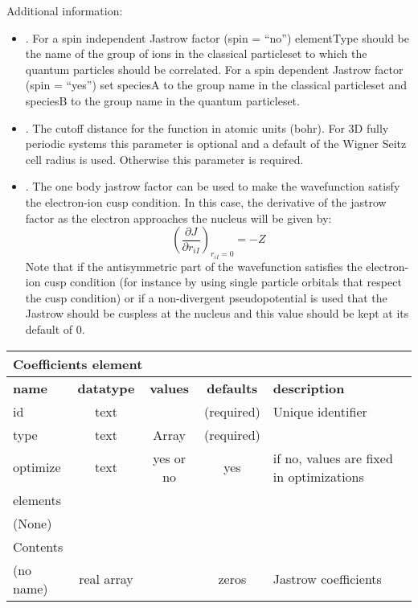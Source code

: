 Additional information:

 \begin{itemize}
 \item {}.  For a spin independent Jastrow factor (spin = ``no'')
elementType should be the name of the group of ions in the classical particleset to which the quantum
particles should be correlated.  For a spin dependent Jastrow factor (spin = ``yes'') set speciesA to the
group name in the classical particleset and speciesB to the group name in the quantum particleset.
 \item {}. The cutoff distance for the function in atomic units (bohr). 
For 3D fully periodic systems this parameter is optional and a default of the Wigner 
Seitz cell radius is used. Otherwise this parameter is required.
 \item {}. The one body jastrow factor can be used to make the wavefunction
satisfy the electron-ion cusp condition\cite{kato}.  In this case, the derivative of the jastrow
factor as the electron approaches the nucleus will be given by:
\begin{equation}
\left(\frac{\partial J}{\partial r_{iI}}\right)_{r_{iI} = 0} = -Z
\end{equation}
Note that if the antisymmetric part of the wavefunction satisfies the electron-ion cusp
condition (for instance by using single particle orbitals that respect the cusp condition)
or if a non-divergent pseudopotential is used that the Jastrow should be cuspless at the 
nucleus and this value should be kept at its default of 0.
 \end{itemize}


\begin{table}[h]
\begin{center}
\begin{tabular}{l c c c l }
\hline
\multicolumn{5}{l}{Coefficients element} \\
\hline
\bfseries name & \bfseries datatype & \bfseries values & \bfseries defaults & \bfseries description \\
\hline
id & text & & (required) & Unique identifier \\
type & text & Array & (required) & \\
optimize & text & yes or no & yes & if no, values are fixed in optimizations \\
\hline
\multicolumn{5}{l}{elements}\\ \hline
(None) & & & \\ \hline
\multicolumn{5}{l}{Contents}\\ \hline
 (no name) & real array & & zeros & Jastrow coefficients \\ \hline
\end{tabular}
\end{center}
\end{table}


